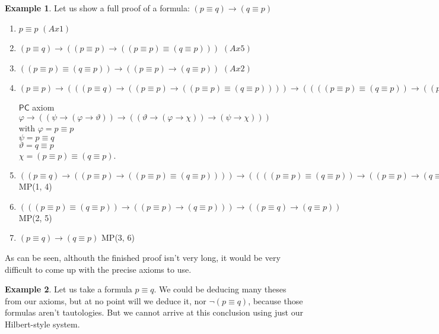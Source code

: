 \documentclass{article}
\theoremstyle{definition}
\theoremstyle{definition}
\newtheorem{example}{Example}[section]
\newcommand*{\id}{\equiv}
\newcommand*{\ra}{\rightarrow}
\newcommand{\PC}{$\mathsf{PC}$\xspace}
\begin{document}
\begin{example}
    Let us show a full proof of a formula: $(p \id q) \ra (q \id p)$

    \begin{enumerate}
        \item $p \id p$ \hfill $(Ax1)$
        \item $(p \id q) \ra ((p \id p) \ra ((p \id p) \id (q \id p)))$ \hfill $(Ax5)$
        \item $((p \id p) \id (q \id p)) \ra ((p \id p) \ra (q \id p))$ \hfill $(Ax2)$
        \item $(p \id p) \ra (((p \id q) \ra ((p \id p) \ra ((p \id p) \id (q \id p)))) \ra ((((p \id p) \id (q \id p)) \ra ((p \id p) \ra (q \id p))) \ra ((p \id q) \ra (q \id p))))$
              \begin{flushright}
                  \PC axiom $\varphi \ra ((\psi \ra (\varphi \ra \vartheta)) \ra ((\vartheta \ra (\varphi \ra \chi)) \ra (\psi \ra \chi)))$
                  \\
                  with $\varphi = p \id p$\\$\psi = p \id q$\\$\vartheta = q \id p$\\$\chi = (p \id p) \id (q \id p)$.
              \end{flushright}
        \item $((p \id q) \ra ((p \id p) \ra ((p \id p) \id (q \id p)))) \ra ((((p \id p) \id (q \id p)) \ra ((p \id p) \ra (q \id p))) \ra ((p \id q) \ra (q \id p)))$ \hfill MP(1, 4)
        \item $(((p \id p) \id (q \id p)) \ra ((p \id p) \ra (q \id p))) \ra ((p \id q) \ra (q \id p))$ \hfill MP(2, 5)
        \item $(p \id q) \ra (q \id p)$ \hfill MP(3, 6)
    \end{enumerate}

\end{example}
As can be seen, althouth the finished proof isn't very long, it would be very
difficult to come up with the precise axioms to use.

\begin{example}
    Let us take a formula $p \id q$. We could be deducing many theses from our axioms, but at no point will we deduce it, nor $\lnot(p \id q)$, because those formulas aren't tautologies. But we cannot arrive at this conclusion using just our Hilbert-style system.
\end{example}
\end{document}
